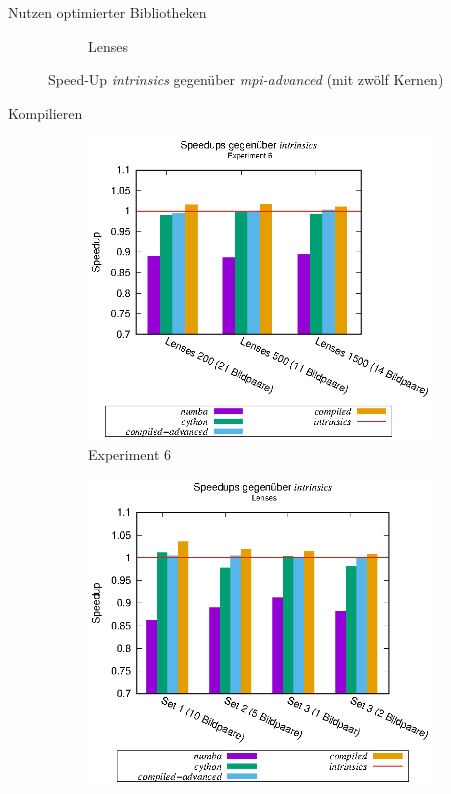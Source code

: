 \begin{frame}{Nutzen optimierter Bibliotheken}
\begin{figure}[h]
\begin{subfigure}[b]{0.47\textwidth}
			\caption{Lenses}
		\end{subfigure}
		\caption{Speed-Up \textit{intrinsics} gegenüber \textit{mpi-advanced} (mit zwölf Kernen)}
	\end{figure}
\end{frame}


\begin{frame}{Kompilieren}
	\begin{figure}[h]
		\begin{subfigure}[b]{0.47\textwidth}
			\centering
			\includegraphics[width=\textwidth]{pdf/speedups_exp6}
			\caption{Experiment 6}
		\end{subfigure}
		\hfill
		\begin{subfigure}[b]{0.47\textwidth}
			\centering
			\includegraphics[width=\textwidth]{pdf/speedups_lenses}

\end{subfigure}
\end{figure}
\end{frame}
